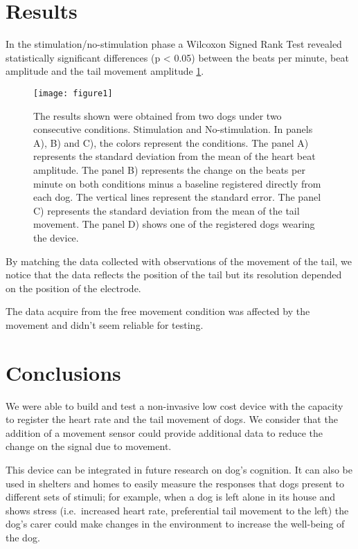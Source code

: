 \documentclass[twocolumn]{bmcart}%
\begin{document}
\section{Results}\label{results}

In the stimulation/no-stimulation phase a Wilcoxon Signed Rank Test
revealed statistically significant differences (p \textless{} 0.05)
between the beats per minute, beat amplitude and the tail movement
amplitude \ref{centfig}.

\begin{figure}[h!]
  \texttt{[image: figure1]}
  \caption{\label{centfig}
The results shown were obtained from two dogs under two consecutive conditions. Stimulation and No-stimulation. In panels A), B) and C), the colors represent the conditions. The panel A) represents the standard deviation from the mean of the heart beat amplitude. The panel B) represents the change on the beats per minute on both conditions minus a baseline registered directly from each dog. The vertical lines represent the standard error. The panel C) represents the standard deviation from the mean of the tail movement. The panel D) shows one of the registered dogs wearing the device.
}
\end{figure}

By matching the data collected with observations of the movement of the
tail, we notice that the data reflects the position of the tail but its
resolution depended on the position of the electrode.

The data acquire from the free movement condition was affected by the
movement and didn't seem reliable for testing.

\section{Conclusions}\label{conclusions}

We were able to build and test a non-invasive low cost device with the
capacity to register the heart rate and the tail movement of dogs. We
consider that the addition of a movement sensor could provide additional
data to reduce the change on the signal due to movement.

This device can be integrated in future research on dog's cognition. It
can also be used in shelters and homes to easily measure the responses
that dogs present to different sets of stimuli; for example, when a dog
is left alone in its house and shows stress (i.e.~increased heart rate,
preferential tail movement to the left) the dog's carer could make
changes in the environment to increase the well-being of the dog.
\end{document}
